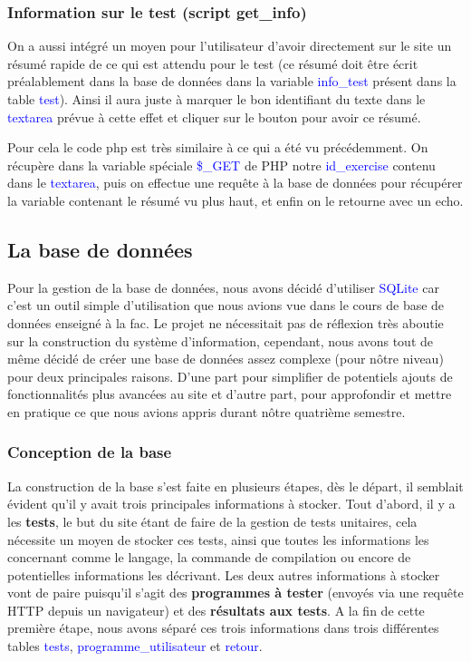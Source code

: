\documentclass[a4paper]{article}
\renewcommand{\texttt}[2][blue]{\textcolor{#1}{\ttfamily #2}}
\begin{document}
\subsubsection{Information sur le test (script get\_info)}
\label{subsec:get-info}

On a aussi intégré un moyen pour l'utilisateur d'avoir directement sur le site
un résumé rapide de ce qui est attendu pour le test (ce résumé doit être écrit
préalablement dans la base de données dans la variable \texttt{info\_test}
présent dans la table \texttt{test}). Ainsi il aura juste à marquer le bon
identifiant du texte dans le \texttt{textarea} prévue à cette effet et cliquer
sur le bouton pour avoir ce résumé.

Pour cela le code php est très similaire à ce qui a été vu précédemment. On récupère
dans la variable spéciale \texttt{\$\_GET} de PHP notre \texttt{id\_exercise}
contenu dans le \texttt{textarea}, puis on effectue une requête à la base de
données pour récupérer la variable contenant le résumé vu plus haut, et enfin on
le retourne avec un echo.


 \subsection{La base de données}%
 \label{sec:La base de données}

  Pour la gestion de la base de données, nous avons décidé d'utiliser
  \texttt{SQLite} car c'est un outil simple d'utilisation que nous avions vue
  dans le cours de base de données enseigné à la fac. Le projet ne nécessitait pas
  de réflexion très aboutie sur la construction du système d'information,
  cependant, nous avons tout de même décidé de créer une base de données assez
  complexe (pour nôtre niveau) pour deux principales raisons. D'une part pour
  simplifier de potentiels ajouts de fonctionnalités plus avancées au site et
  d'autre part, pour approfondir et mettre en pratique ce que nous avions appris
  durant nôtre quatrième semestre.

  \subsubsection{Conception de la base}%
  \label{sub:Conception de la base}


  La construction de la base s'est faite en plusieurs étapes, dès le départ, il
  semblait évident qu'il y avait trois principales informations à stocker. Tout
  d'abord, il y a les \textbf{tests}, le but du site étant de faire de la
  gestion de tests unitaires, cela nécessite un moyen de stocker ces tests,
  ainsi que toutes les informations les concernant comme le langage, la
  commande de compilation ou encore de potentielles informations les décrivant.
  Les deux autres informations à stocker vont de paire puisqu'il s'agit des
  \textbf{programmes à tester} (envoyés via une requête HTTP depuis un
  navigateur) et des \textbf{résultats aux tests}. A la fin de cette première
  étape, nous avons séparé ces trois informations dans trois différentes tables
  \texttt{tests}, \texttt{programme\_utilisateur} et \texttt{retour}.
\end{document}
